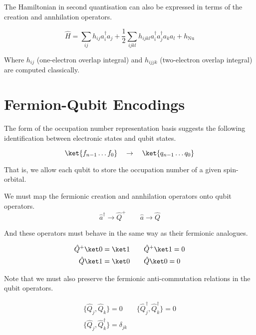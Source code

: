 The Hamiltonian in second quantisation can also be expressed in terms of the creation and annhilation operators.

\begin{equation*}
    \hat H =
    \sum_{ij} h_{ij} a^\dagger_i a_j +
    \frac{1}{2} \sum_{ijkl} h_{ijkl} a^\dagger_i a^\dagger_j a_k a_l +
    h_\text{Nu}
\end{equation*}

Where $h_{ij}$ (one-electron overlap integral) and $h_{ijjk}$ (two-electron overlap integral) are computed classically.


\section{Fermion-Qubit Encodings}
The form of the occupation number representation basis suggests the following identification between electronic states and qubit states.

\begin{equation*}
    \ket{f_{n-1} \dots f_{0}} \quad\rightarrow\quad \ket{q_{n-1} \dots q_{0}}
\end{equation*}

That is, we allow each qubit to store the occupation number of a given spin-orbital.


We must map the fermionic creation and annhilation operators onto qubit operators.
\begin{equation*}
    \hat a^\dagger \rightarrow \hat Q^+ \qquad
    \hat a \rightarrow \hat Q
\end{equation*}

And these operators must behave in the same way as their fermionic analogues.

\begin{equation*}
\begin{gathered}
    \hat Q^+ \ket 0 = \ket 1 \qquad \hat Q^+ \ket 1 = 0 \\
    \hat Q \ket 1 = \ket 0 \qquad \hat Q \ket 0 = 0
\end{gathered}
\end{equation*}

Note that we must also preserve the fermionic anti-commutation relations in the qubit operators.

\begin{equation*}
\begin{gathered}
    \{ \hat Q_{j}, \hat Q_{k} \} = 0 \qquad
    \{ \hat Q_{j}^{\dagger}, \hat Q_{k}^{\dagger} \} = 0 \\
    \{ \hat Q_{j}, \hat Q_{k}^{\dagger} \} = \delta_{jk}
\end{gathered}
\end{equation*}\medskip

